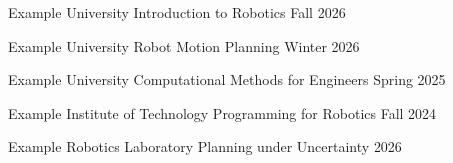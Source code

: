 

\VectraTeachingEntry
    {Example University}
    {Introduction to Robotics}
    {
    }
    {Fall 2026}

\VectraTeachingEntry
    {Example University}
    {Robot Motion Planning}
    {}
    {Winter 2026}


\VectraTeachingEntry
    {Example University}
    {Computational Methods for Engineers}
    {
    }
    {Spring 2025}

\VectraTeachingEntry
    {Example Institute of Technology}
    {Programming for Robotics}
    {}
    {Fall 2024}


\VectraTeachingEntry
    {Example Robotics Laboratory}
    {Planning under Uncertainty}
    {
    }
    {2026}